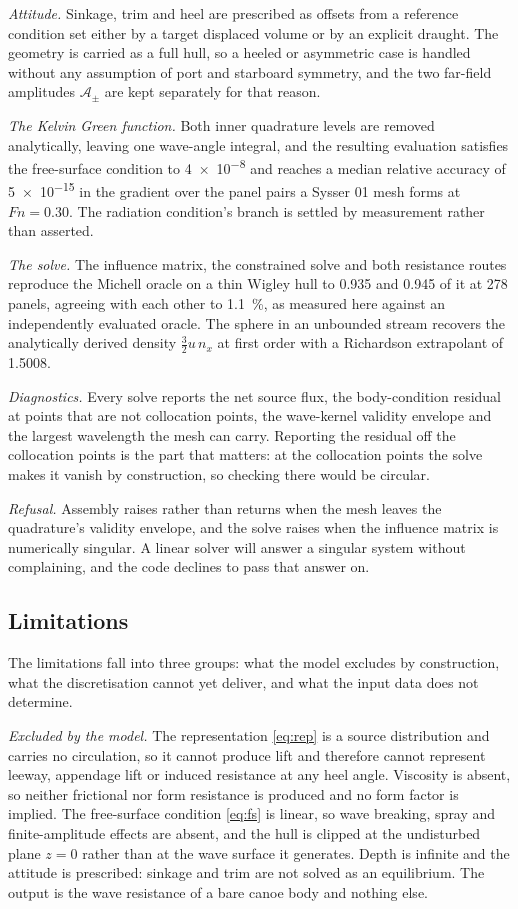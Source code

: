\documentclass[11pt]{article}
\newcommand{\Fn}{\mathit{Fn}}
\begin{document}
\textit{Attitude.} Sinkage, trim and heel are prescribed as offsets from a reference
condition set either by a target displaced volume or by an explicit draught. The geometry
is carried as a full hull, so a heeled or asymmetric case is handled without any assumption
of port and starboard symmetry, and the two far-field amplitudes $\mathcal{A}_\pm$ are kept
separately for that reason.

\textit{The Kelvin Green function.} Both inner quadrature levels are removed analytically,
leaving one wave-angle integral, and the resulting evaluation satisfies the free-surface
condition to \num{4e-8} and reaches a median relative accuracy of \num{5e-15} in the
gradient over the panel pairs a Sysser 01 mesh forms at $\Fn = 0.30$. The radiation
condition's branch is settled by measurement rather than asserted.

\textit{The solve.} The influence matrix, the constrained solve and both resistance routes
reproduce the Michell oracle on a thin Wigley hull to \num{0.935} and \num{0.945} of it at
278 panels, agreeing with each other to \SI{1.1}{\percent}, as measured here against an
independently evaluated oracle. The sphere in an unbounded stream
recovers the analytically derived density $\tfrac{3}{2}u\,n_x$ at first order with a
Richardson extrapolant of \num{1.5008}.

\textit{Diagnostics.} Every solve reports the net source flux, the body-condition residual
at points that are not collocation points, the wave-kernel validity envelope and the
largest wavelength the mesh can carry. Reporting the residual off the collocation points
is the part that matters: at the collocation points the solve makes it vanish by
construction, so checking there would be circular.

\textit{Refusal.} Assembly raises rather than returns when the mesh leaves the quadrature's
validity envelope, and the solve raises when the influence matrix is numerically singular.
A linear solver will answer a singular system without complaining, and the code declines to
pass that answer on.

\subsection{Limitations}

The limitations fall into three groups: what the model excludes by construction, what the
discretisation cannot yet deliver, and what the input data does not determine.

\textit{Excluded by the model.} The representation \eqref{eq:rep} is a source distribution
and carries no circulation, so it cannot produce lift and therefore cannot represent
leeway, appendage lift or induced resistance at any heel angle. Viscosity is absent, so
neither frictional nor form resistance is produced and no form factor is implied. The
free-surface condition \eqref{eq:fs} is linear, so wave breaking, spray and finite-amplitude
effects are absent, and the hull is clipped at the undisturbed plane $z=0$ rather than at
the wave surface it generates. Depth is infinite and the attitude is prescribed: sinkage
and trim are not solved as an equilibrium. The output is the wave resistance of a bare
canoe body and nothing else.
\end{document}

